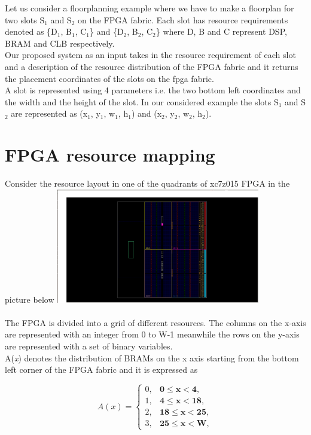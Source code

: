 \documentclass[conference]{IEEEtran}
\begin{document}
Let us consider a floorplanning example where we have to make a floorplan for two slots S$_1$ and S$_2$ on the FPGA fabric. Each slot has resource requirements denoted as \{D$_1$, B$_1$, C$_1$\} and \{D$_2$, B$_2$, C$_2$\} where D, B and C represent DSP, BRAM and CLB respectively. \\ Our proposed system as an input takes in the resource requirement of each slot and a description of the resource distribution of the FPGA fabric and it returns the placement coordinates of the slots on the fpga fabric. \\
A slot is represented using 4 parameters i.e. the two bottom left coordinates and the width and the height of the slot. In our considered example the slots S$_1$ and S$_2$ are represented as (x$_1$, y$_1$, w$_1$, h$_1$) and (x$_2$, y$_2$, w$_2$, h$_2$). \\ 


\section{FPGA resource mapping}
Consider the resource layout in one of the quadrants of xc7z015 FPGA in the picture below
\includegraphics[width=\textwidth, height=5cm]{graphics/fpga_1.png} \\ \\

The FPGA is divided into a grid of different resources. The columns on the x-axis are represented with an integer from 0 to W-1 meanwhile the rows on the y-axis are represented with a set of binary variables. \\
 
A(\textit{x}) denotes the distribution of BRAMs on the x axis starting from the bottom left corner of the FPGA fabric and it is expressed as 

\begin{equation}
A(x) = \begin{cases}
0, & \textbf{0$\leq$x$<$4}, \\
1, & \textbf{4$\leq$x$<$18}, \\
2, & \textbf{18$\leq$x$<$25}, \\
3, & \textbf{25$\leq$x$<$W},
\end{cases}
\end{equation}
\end{document}
